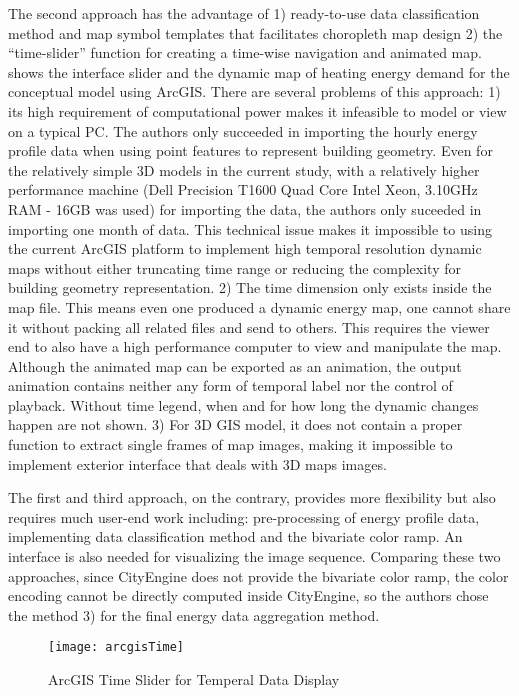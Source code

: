 The second approach has the advantage of 1) ready-to-use data
classification method and map symbol templates that facilitates
choropleth map design 2) the ``time-slider'' function for creating a
time-wise navigation and animated map.  shows the
interface slider and the dynamic map of heating energy demand for the
conceptual model using ArcGIS. There are several problems of this
approach: 1) its high requirement of computational power makes it
infeasible to model or view on a typical PC. The authors only
succeeded in importing the hourly energy profile data when using point
features to represent building geometry. Even for the relatively
simple 3D models in the current study, with a relatively higher
performance machine (Dell Precision T1600 Quad Core Intel Xeon,
3.10GHz RAM - 16GB was used) for importing the data, the authors only
suceeded in importing one month of data. This technical issue makes it
impossible to using the current ArcGIS platform to implement high
temporal resolution dynamic maps without either truncating time range
or reducing the complexity for building geometry representation. 2)
The time dimension only exists inside the map file. This means even
one produced a dynamic energy map, one cannot share it without packing
all related files and send to others. This requires the viewer end to
also have a high performance computer to view and manipulate the
map. Although the animated map can be exported as an animation, the
output animation contains neither any form of temporal label nor the
control of playback. Without time legend, when and for how long the
dynamic changes happen are not shown. 3) For 3D GIS model, it does not
contain a proper function to extract single frames of map images,
making it impossible to implement exterior interface that deals with
3D maps images.

The first and third approach, on the contrary, provides more
flexibility but also requires much user-end work including:
pre-processing of energy profile data, implementing data
classification method and the bivariate color ramp. An interface is
also needed for visualizing the image sequence. Comparing these two
approaches, since CityEngine does not provide the bivariate color
ramp, the color encoding cannot be directly computed inside
CityEngine, so the authors chose the method 3) for the final energy
data aggregation method.

\begin{figure}[h!]
  \centering
  \texttt{[image: arcgisTime]}
  \caption{ArcGIS Time Slider for Temperal Data Display}
  \label{fig:arcgisTime}
\end{figure}

